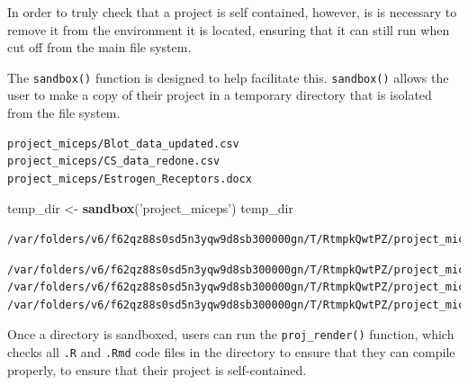 \documentclass[12pt,twoside]{reedthesis}
\newenvironment{Shaded}{\begin{snugshade}}{\end{snugshade}}
\newcommand{\DecValTok}[1]{\textcolor[rgb]{0.00,0.00,0.81}{#1}}
\newcommand{\KeywordTok}[1]{\textcolor[rgb]{0.13,0.29,0.53}{\textbf{#1}}}
\newcommand{\NormalTok}[1]{#1}
\newcommand{\OperatorTok}[1]{\textcolor[rgb]{0.81,0.36,0.00}{\textbf{#1}}}
\newcommand{\StringTok}[1]{\textcolor[rgb]{0.31,0.60,0.02}{#1}}
\begin{document}
In order to truly check that a project is self contained, however, is is necessary to remove it from the environment it is located, ensuring that it can still run when cut off from the main file system.

The \texttt{sandbox()} function is designed to help facilitate this. \texttt{sandbox()} allows the user to make a copy of their project in a temporary directory that is isolated from the file system.
\begin{Shaded}
\end{Shaded}
\begin{verbatim}
project_miceps/Blot_data_updated.csv   project_miceps/CS_data_redone.csv      
project_miceps/Estrogen_Receptors.docx 
\end{verbatim}
\begin{Shaded}
\begin{Highlighting}[]
\NormalTok{temp_dir <-}\StringTok{ }\KeywordTok{sandbox}\NormalTok{(}\StringTok{'project_miceps'}\NormalTok{)}
\NormalTok{temp_dir}
\end{Highlighting}
\end{Shaded}
\begin{verbatim}
/var/folders/v6/f62qz88s0sd5n3yqw9d8sb300000gn/T/RtmpkQwtPZ/project_miceps
\end{verbatim}
\begin{Shaded}
\end{Shaded}
\begin{verbatim}
/var/folders/v6/f62qz88s0sd5n3yqw9d8sb300000gn/T/RtmpkQwtPZ/project_miceps/Blot_data_updated.csv
/var/folders/v6/f62qz88s0sd5n3yqw9d8sb300000gn/T/RtmpkQwtPZ/project_miceps/CS_data_redone.csv
/var/folders/v6/f62qz88s0sd5n3yqw9d8sb300000gn/T/RtmpkQwtPZ/project_miceps/Estrogen_Receptors.docx
\end{verbatim}
Once a directory is sandboxed, users can run the \texttt{proj\_render()} function, which checks all \texttt{.R} and \texttt{.Rmd} code files in the directory to ensure that they can compile properly, to ensure that their project is self-contained.
\end{document}
